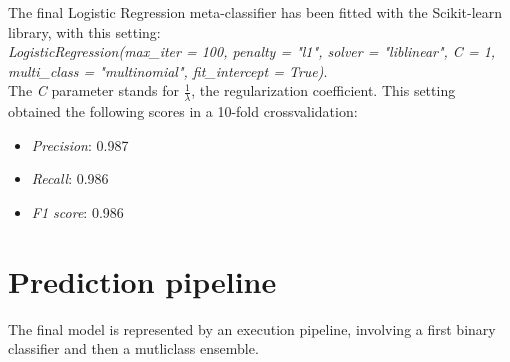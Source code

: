 The final Logistic Regression meta-classifier has been fitted with the Scikit-learn library, with this setting:\\
\textit{LogisticRegression(max\_iter = 100, penalty = "l1", solver = "liblinear", C = 1, multi\_class = "multinomial", fit\_intercept = True)}.\\
The \textit{C} parameter stands for $ \frac{1}{\lambda} $, the regularization coefficient.
This setting obtained the following scores in a 10-fold crossvalidation:
\begin{itemize}
	\item[\PencilRight] \textit{Precision}: 0.987
	\item[\PencilRight] \textit{Recall}: 0.986
	\item[\PencilRight] \textit{F1 score}: 0.986
\end{itemize}

\section{Prediction pipeline}
\label{predicion_pipeline}
The final model is represented by an execution pipeline, involving a first binary classifier and then a mutliclass ensemble.

